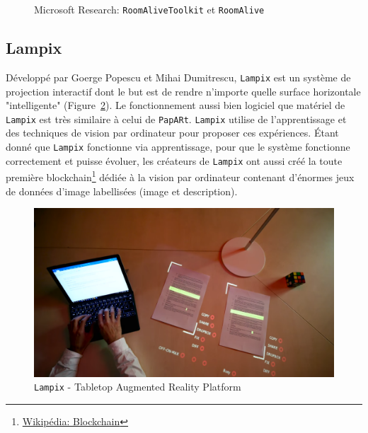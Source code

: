 \begin{figure}[H]
    \centering
\caption{Microsoft Research: \texttt{RoomAliveToolkit} et \texttt{RoomAlive}\protect\footnotemark}
\label{fig:roomalive}
\end{figure}

\subsection{Lampix} 
Développé par Goerge Popescu et Mihai Dumitrescu, \texttt{Lampix} est un système de projection interactif dont le but est de rendre n'importe quelle surface horizontale "intelligente" (Figure~\ref{fig:lampix}). Le fonctionnement aussi bien logiciel que matériel de \texttt{Lampix} est très similaire à celui de \texttt{\texttt{PapARt}}. \texttt{Lampix} utilise de l'apprentissage et des techniques de vision par ordinateur pour proposer ces expériences. Étant donné que \texttt{Lampix} fonctionne via apprentissage, pour que le système fonctionne correctement et puisse évoluer, les créateurs de \texttt{Lampix} ont aussi créé la toute première blockchain\footnote{\href{https://fr.wikipedia.org/wiki/Blockchain}{Wikipédia: Blockchain}} dédiée à la vision par ordinateur contenant d'énormes jeux de données d'image labellisées (image et description).
     
\begin{figure}[H]
\centering
\includegraphics[width=0.7\linewidth]{images/lampix}
\caption{\texttt{Lampix} - Tabletop Augmented Reality Platform\protect\footnotemark}
\label{fig:lampix}
\end{figure} 

